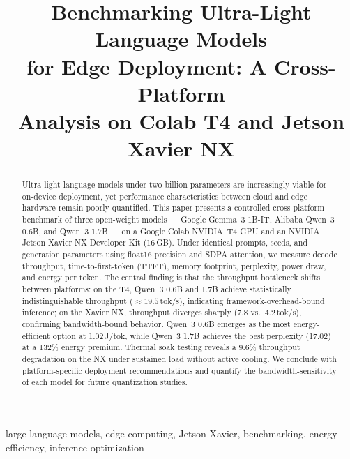 \documentclass[conference]{IEEEtran}
\begin{document}
\title{Benchmarking Ultra-Light Language Models\\ for Edge Deployment: A Cross-Platform\\ Analysis on Colab T4 and Jetson Xavier NX\\
}

\author{
}

\maketitle

\begin{abstract}
Ultra-light language models under two billion parameters are increasingly viable for on-device deployment, yet performance characteristics between cloud and edge hardware remain poorly quantified. This paper presents a controlled cross-platform benchmark of three open-weight models --- Google Gemma~3 1B-IT, Alibaba Qwen~3 0.6B, and Qwen~3 1.7B --- on a Google Colab NVIDIA~T4 GPU and an NVIDIA Jetson Xavier NX Developer Kit (16\,GB). Under identical prompts, seeds, and generation parameters using float16 precision and SDPA attention, we measure decode throughput, time-to-first-token (TTFT), memory footprint, perplexity, power draw, and energy per token. The central finding is that the throughput bottleneck shifts between platforms: on the T4, Qwen~3 0.6B and 1.7B achieve statistically indistinguishable throughput (${\approx}19.5$\,tok/s), indicating framework-overhead-bound inference; on the Xavier NX, throughput diverges sharply (7.8 vs.\ 4.2\,tok/s), confirming bandwidth-bound behavior. Qwen~3 0.6B emerges as the most energy-efficient option at 1.02\,J/tok, while Qwen~3 1.7B achieves the best perplexity (17.02) at a 132\% energy premium. Thermal soak testing reveals a 9.6\% throughput degradation on the NX under sustained load without active cooling. We conclude with platform-specific deployment recommendations and quantify the bandwidth-sensitivity of each model for future quantization studies.
\end{abstract}

\begin{IEEEkeywords}
large language models, edge computing, Jetson Xavier, benchmarking, energy efficiency, inference optimization
\end{IEEEkeywords}
\end{document}
